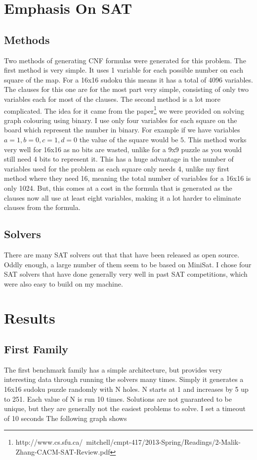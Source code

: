\documentclass[11pt]{article} %
\begin{document}
\section{Emphasis On SAT}
\subsection{Methods}
Two methods of generating CNF formulas were generated for this problem. The first method is very simple. It uses 1 variable for each possible number on each square of the map. For a 16x16 sudoku this means it has a total of 4096 variables. The clauses for this one are for the most part very simple, consisting of only two variables each for most of the clauses. The second method is a lot more complicated. The idea for it came from the paper\footnote{http://www.cs.sfu.ca/~mitchell/cmpt-417/2013-Spring/Readings/2-Malik-Zhang-CACM-SAT-Review.pdf} we were provided on solving graph colouring using binary. I use only four variables for each square on the board which represent the number in binary. For example if we have variables $a = 1, b = 0, c = 1, d = 0$ the value of the square would be $5$. This method works very well for 16x16 as no bits are wasted, unlike for a 9x9 puzzle as you would still need 4 bits to represent it. This has a huge advantage in the number of variables used for the problem as each square only needs 4, unlike my first method where they need 16, meaning the total number of variables for a 16x16 is only 1024. But, this comes at a cost in the formula that is generated as the clauses now all use at least eight variables, making it a lot harder to eliminate clauses from the formula.
\subsection{Solvers}
There are many SAT solvers out that that have been released as open source. Oddly enough, a large number of them seem to be based on MiniSat. I chose four SAT solvers that have done generally very well in past SAT competitions, which were also easy to build on my machine.

\section{Results}
\subsection{First Family}
The first benchmark family has a simple architecture, but provides very interesting data through running the solvers many times. Simply it generates a 16x16 sudoku puzzle randomly with N holes. N starts at 1 and increases by 5 up to 251. Each value of N is run 10 times. Solutions are not guaranteed to be unique, but they are generally not the easiest problems to solve. I set a timeout of 10 seconds The following graph shows
\end{document}
